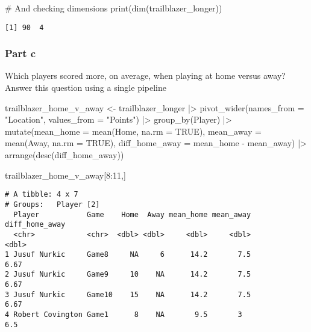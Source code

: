 \documentclass[
  letterpaper,
  DIV=11,
  numbers=noendperiod]{scrartcl}
\newenvironment{Shaded}{\begin{snugshade}}{\end{snugshade}}
\newcommand{\AttributeTok}[1]{\textcolor[rgb]{0.40,0.45,0.13}{#1}}
\newcommand{\CommentTok}[1]{\textcolor[rgb]{0.37,0.37,0.37}{#1}}
\newcommand{\ConstantTok}[1]{\textcolor[rgb]{0.56,0.35,0.01}{#1}}
\newcommand{\DecValTok}[1]{\textcolor[rgb]{0.68,0.00,0.00}{#1}}
\newcommand{\FunctionTok}[1]{\textcolor[rgb]{0.28,0.35,0.67}{#1}}
\newcommand{\NormalTok}[1]{\textcolor[rgb]{0.00,0.23,0.31}{#1}}
\newcommand{\OtherTok}[1]{\textcolor[rgb]{0.00,0.23,0.31}{#1}}
\newcommand{\SpecialCharTok}[1]{\textcolor[rgb]{0.37,0.37,0.37}{#1}}
\newcommand{\StringTok}[1]{\textcolor[rgb]{0.13,0.47,0.30}{#1}}
\begin{document}
\begin{Shaded}
\begin{Highlighting}[]
\CommentTok{\# And checking dimensions}
\FunctionTok{print}\NormalTok{(}\FunctionTok{dim}\NormalTok{(trailblazer\_longer))}
\end{Highlighting}
\end{Shaded}

\begin{verbatim}
[1] 90  4
\end{verbatim}

\subsubsection{Part c}\label{part-c}

Which players scored more, on average, when playing at home versus away?
Answer this question using a single pipeline

\begin{Shaded}
\begin{Highlighting}[]
\NormalTok{trailblazer\_home\_v\_away }\OtherTok{\textless{}{-}} 
\NormalTok{  trailblazer\_longer }\SpecialCharTok{|\textgreater{}} 
  \FunctionTok{pivot\_wider}\NormalTok{(}\AttributeTok{names\_from =} \StringTok{"Location"}\NormalTok{, }\AttributeTok{values\_from =} \StringTok{"Points"}\NormalTok{) }\SpecialCharTok{|\textgreater{}}
  \FunctionTok{group\_by}\NormalTok{(Player) }\SpecialCharTok{|\textgreater{}}
  \FunctionTok{mutate}\NormalTok{(}\AttributeTok{mean\_home =} \FunctionTok{mean}\NormalTok{(Home, }\AttributeTok{na.rm =} \ConstantTok{TRUE}\NormalTok{),}
         \AttributeTok{mean\_away =} \FunctionTok{mean}\NormalTok{(Away, }\AttributeTok{na.rm =} \ConstantTok{TRUE}\NormalTok{),}
         \AttributeTok{diff\_home\_away =}\NormalTok{ mean\_home }\SpecialCharTok{{-}}\NormalTok{ mean\_away) }\SpecialCharTok{|\textgreater{}}
  \FunctionTok{arrange}\NormalTok{(}\FunctionTok{desc}\NormalTok{(diff\_home\_away))}
  
\NormalTok{trailblazer\_home\_v\_away[}\DecValTok{8}\SpecialCharTok{:}\DecValTok{11}\NormalTok{,]}
\end{Highlighting}
\end{Shaded}

\begin{verbatim}
# A tibble: 4 x 7
# Groups:   Player [2]
  Player           Game    Home  Away mean_home mean_away diff_home_away
  <chr>            <chr>  <dbl> <dbl>     <dbl>     <dbl>          <dbl>
1 Jusuf Nurkic     Game8     NA     6      14.2       7.5           6.67
2 Jusuf Nurkic     Game9     10    NA      14.2       7.5           6.67
3 Jusuf Nurkic     Game10    15    NA      14.2       7.5           6.67
4 Robert Covington Game1      8    NA       9.5       3             6.5 
\end{verbatim}
\end{document}
